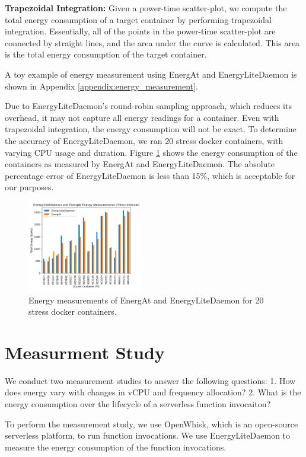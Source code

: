 \documentclass[times, 10pt,twocolumn]{article}
\begin{document}
\textbf{Trapezoidal Integration:} Given a power-time scatter-plot, we compute the total energy consumption of a target container by performing trapezoidal integration. Essentially, all of the points in the power-time scatter-plot are connected by straight lines, and the area under the curve is calculated. This area is the total energy consumption of the target container. 

A toy example of energy measurement using EnergAt and EnergyLiteDaemon is shown in Appendix \ref{appendix:energy_measurement}.

Due to EnergyLiteDaemon's round-robin sampling approach, which reduces its overhead, it may not capture all energy readings for a container. Even with trapezoidal integration, the energy consumption will not be exact. To determine the accuracy of EnergyLiteDaemon, we ran 20 stress docker containers, with varying CPU usage and duration. Figure \ref{fig:EnergyLiteDaemon_Efficacy} shows the energy consumption of the containers as measured by EnergAt and EnergyLiteDaemon. The absolute percentage error of EnergyLiteDaemon is less than 15\%, which is acceptable for our purposes.

\begin{figure}[ht]
   \centering
   \includegraphics[width=0.45\textwidth]{imgs/EnergyLiteDaemon_Efficacy.png}
   \caption{Energy measurements of EnergAt and EnergyLiteDaemon for 20 stress docker containers.}
   \label{fig:EnergyLiteDaemon_Efficacy}
 \end{figure}

\section{Measurment Study}

We conduct two measurement studies to answer the following questions: 1. How does energy vary with changes in vCPU and frequency allocation? 2. What is the energy consumption over the lifecycle of a serverless function invocaiton?

To perform the measurement study, we use OpenWhisk, which is an open-source serverless platform, to run function invocations. We use EnergyLiteDaemon to measure the energy consumption of the function invocations.
\end{document}
